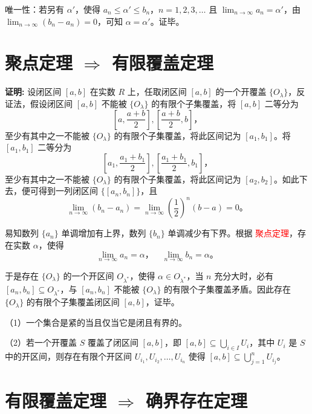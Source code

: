 \documentclass[lang=cn,newtx,10pt,scheme=chinese]{elegantbook}
\begin{document}
唯一性：若另有 $\alpha'$，使得 $a_n \leq \alpha' \leq b_n，n = 1, 2, 3, \ldots$ 且 $\lim_{n \to \infty} a_n = \alpha'，$由 $\lim_{n \to \infty} (b_n - a_n) = 0$，可知 $\alpha = \alpha'$。证毕。


\section*{聚点定理 $\Rightarrow$ 有限覆盖定理}

\textbf{证明:} 设闭区间 $[a, b]$ 在实数 $R$ 上，任取闭区间 $[a, b]$ 的一个开覆盖 $\{O_{\lambda}\}$，反证法，假设闭区间 $[a, b]$ 不能被 $\{O_{\lambda}\}$ 的有限个子集覆盖，将 $[a, b]$ 二等分为
\[
\left[ a, \frac{a + b}{2} \right], \left[ \frac{a + b}{2}, b \right]，
\]
至少有其中之一不能被 $\{O_{\lambda}\}$ 的有限个子集覆盖，将此区间记为 $[a_1, b_1]$。将 $[a_1, b_1]$ 二等分为
\[
\left[ a_1, \frac{a_1 + b_1}{2} \right], \left[ \frac{a_1 + b_1}{2}, b_1 \right]，
\]
至少有其中之一不能被 $\{O_{\lambda}\}$ 的有限个子集覆盖，将此区间记为 $[a_2, b_2]$。如此下去，便可得到一列闭区间 $\{[a_n, b_n]\}$，且
\[
\lim_{n \to \infty} (b_n - a_n) = \lim_{n \to \infty} \left(\frac{1}{2}\right)^n (b - a) = 0。
\]

易知数列 $\{a_n\}$ 单调增加有上界，数列 $\{b_n\}$ 单调减少有下界。根据 \textcolor{red}{聚点定理}，存在实数 $\alpha$，使得
\[
\lim_{n \to \infty} a_n = \alpha， \quad \lim_{n \to \infty} b_n = \alpha。
\]

于是存在 $\{O_{\lambda}\}$ 的一个开区间 $O_{\lambda^*}$，使得 $\alpha \in O_{\lambda^*}$，当 $n$ 充分大时，必有 $[a_n, b_n] \subseteq O_{\lambda^*}$，与 $[a_n, b_n]$ 不能被 $\{O_{\lambda}\}$ 的有限个子集覆盖矛盾。因此存在 $\{O_{\lambda}\}$ 的有限个子集覆盖闭区间 $[a, b]$，证毕。




\begin{theorem}[ 有限覆盖定理] \label{ pro:js5}
（1）一个集合是紧的当且仅当它是闭且有界的。

（2）若一个开覆盖 \( S \) 覆盖了闭区间 \([a, b]\)，即 \([a, b] \subseteq \bigcup_{i \in I} U_i\)，其中 \( U_i \) 是 \( S \) 中的开区间，则存在有限个开区间 \( U_{i_1}, U_{i_2}, \ldots, U_{i_n} \) 使得 \([a, b] \subseteq \bigcup_{j=1}^n U_{i_j}\)。

\end{theorem}


\section*{有限覆盖定理 $\Rightarrow$ 确界存在定理}
\end{document}
